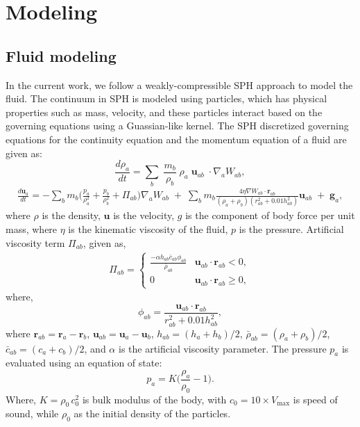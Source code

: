 \documentclass[a4paper,11pt]{book}
\newcommand{\ten}[1]{\ensuremath{\mathbf{#1}}}
\begin{document}
\section{Modeling}
\subsection{Fluid modeling}

In the current work, we follow a weakly-compressible SPH approach to model the
fluid. The continuum in SPH is modeled using particles, which has physical
properties such as mass, velocity, and these particles interact based on the
governing equations using a Guassian-like kernel. The SPH discretized governing
equations for the continuity equation and the momentum equation of a fluid are
given as:
\begin{equation}
  \label{eq:sph-discretization-continuity}
  \frac{{d}\rho_a}{dt} = \sum_{b} \; \frac{m_b}{\rho_{b}} \;
  \rho_{a} \; {\ten{u}}_{ab} \; \cdot \nabla_{a} W_{ab},
\end{equation}
\begin{multline}
  \label{eq:sph-momentum-fluid}
  \frac{{d}\ten{u}_{a}}{dt} = - \sum_{b} m_b
  \bigg(\frac{p_a}{\rho_a^2} + \frac{p_b}{\rho_b^2} + \Pi_{ab}\bigg)
  \nabla_{a} W_{ab}
 \;+\;
  \sum_{b} m_b \frac{4 \eta \nabla W_{ab}\cdot
    \ten{r}_{ab}}{(\rho_a + \rho_b) (r_{ab}^2 + 0.01 h_{ab}^2)} \ten{u}_{ab}  \;+\;
  \ten{g}_{a},
\end{multline}
where $\rho$ is the density, $\ten{u}$ is the velocity, $g$ is the component of
body force per unit mass, where $\eta$ is the kinematic viscosity of the fluid,
$p$ is the pressure.  Artificial viscosity term $\Pi_{ab}$, given as,
\begin{align}
  \label{eq:mom-av}
  \Pi_{ab} =
  \begin{cases}
\frac{-\alpha h_{ab} \bar{c}_{ab} \phi_{ab}}{\bar{\rho}_{ab}}
  & \ten{u}_{ab}\cdot \ten{r}_{ab} < 0, \\
  0 & \ten{u}_{ab}\cdot \ten{r}_{ab} \ge 0,
\end{cases}
\end{align}
where,
%
\begin{equation}
  \label{eq:av-phiij}
  \phi_{ab} = \frac{\ten{u}_{ab} \cdot \ten{r}_{ab}}{r^2_{ab} + 0.01 h^2_{ab}},
\end{equation}
%
where $\ten{r}_{ab} = \ten{r}_a - \ten{r}_b$,
$\ten{u}_{ab} = \ten{u}_a - \ten{u}_b$, $h_{ab} = (h_a + h_b)/2$,
$\bar{\rho}_{ab} = (\rho_a + \rho_b)/2$, $\bar{c}_{ab} = (c_a + c_b) / 2$, and
$\alpha$ is the artificial viscosity parameter.  The pressure $p_a$ is evaluated
using an equation of state:
\begin{equation}
\label{eqn:sph-eos}
  p_a = K \bigg(\frac{\rho_a}{\rho_{0}} - 1 \bigg).
\end{equation}
Where, $K=\rho_0 \, c_0^2$ is bulk modulus of the body, with
$c_0=10 \times V_{\text{max}}$ is speed of sound, while $\rho_0$ as the
initial density of the particles.
\end{document}
